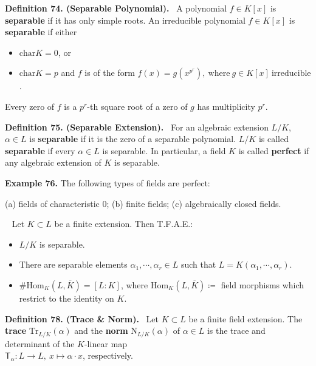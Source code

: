 \documentclass[12pt,a4paper,footinclude=true,headinclude=true]{scrbook} %
\newenvironment{theorem}[2][]
{\renewcommand\theinnercustomthm{#2}\innercustomthm[#1]
\begin{mdframed}[backgroundcolor=yellow!20]\ }
{\end{mdframed}\endinnercustomthm}
\newenvironment{definition}[2][Definition]
    { \begin{mdframed}[backgroundcolor=gray!20] \textbf{#1 #2.}\ }
    {  \end{mdframed}}
\newenvironment{example}[2][Example]
    { \begin{mdframed}[backgroundcolor=gray!20] \textbf{#1 #2.} }
    {  \end{mdframed}}
\begin{document}
\begin{definition}{74. (Separable Polynomial)}
    A polynomial $f\in K[x]$ is \textbf{separable} if it has only simple roots. An irreducible polynomial $f\in K[x]$ is \textbf{separable} if either
    \begin{itemize}
        \item[(i)] $\mathrm{char}K=0$, or
        \item[(ii)] $\mathrm{char}K=p$ and $f$ is of the form $f(x)=g(x^{p^r}) ,\ \text{where}\ g\in K[x]\ \text{irreducible}$.
    \end{itemize}
    Every zero of $f$ is a $p^r$-th square root of a zero of $g$ has multiplicity $p^r$.
\end{definition}

\begin{definition}{75. (Separable Extension)}
    For an algebraic extension $L/K$, $\alpha\in L$ is \textbf{separable} if it is the zero of a separable polynomial. $L/K$ is called \textbf{separable} if every $\alpha\in L$ is separable. In particular, a field $K$ is called \textbf{perfect} if any algebraic extension of $K$ is separable.
\end{definition}

\begin{example}{76}
    The following types of fields are perfect: \\ 
    \centerline{(a) fields of characteristic 0; (b) finite fields; (c) algebraically closed fields.}
\end{example}

\begin{theorem}{77}
    Let $K\subset L$ be a finite extension. Then T.F.A.E.:
    \begin{itemize}
        \item[(a)] $L/K$ is separable.
        \item[(b)] There are separable elements $\alpha_1,\cdots,\alpha_r\in L$ such that $L=K(\alpha_1,\cdots,\alpha_r)$.
        \item[(c)] $\#\mathrm{Hom}_K(L,\overline{K})=[L:K]$, where $\mathrm{Hom}_K(L,\overline{K})\coloneqq$ field morphisms which restrict to the identity on $K$. 
    \end{itemize}
\end{theorem}

\begin{definition}{78. (Trace \& Norm)}
    Let $K\subset L$ be a finite field extension. The \textbf{trace} $\mathrm{Tr}_{L/K}(\alpha)$ and the \textbf{norm} $\mathrm{N}_{L/K}(\alpha)$ of $\alpha\in L$ is the trace and determinant of the $K$-linear map\\ $\mathsf{T}_\alpha:L\to L,\ x\mapsto\alpha\cdot x$, respectively.
\end{definition}
\end{document}
